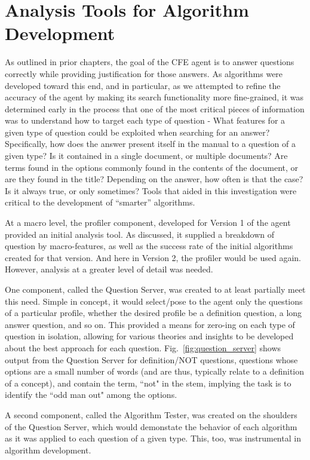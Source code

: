 \section{Analysis Tools for Algorithm Development}

As outlined in prior chapters, the goal of the CFE agent is to answer questions correctly while providing justification for those answers.  As algorithms were developed toward this end, and in particular, as we attempted to refine the accuracy of the agent by making its search functionality more fine-grained, it was determined early in the process that one of the most critical pieces of information was to understand how to target each type of question - What features for a given type of question could be exploited when searching for an answer?  Specifically, how does the answer present itself in the manual to a question of a given type?  Is it contained in a single document, or multiple documents?  Are terms found in the options commonly found in the contents of the document, or are they found in the title?  Depending on the answer, how often is that the case?  Is it always true, or only sometimes?  Tools that aided in this investigation were critical to the development of ``smarter'' algorithms.  

At a macro level, the profiler component, developed for Version 1 of the agent provided an initial analysis tool.  As discussed, it supplied a breakdown of question by macro-features, as well as the success rate of the initial algorithms created for that version.  And here in Version 2, the profiler would be used again.  However, analysis at a greater level of detail was needed.

One component, called the Question Server, was created to at least partially meet this need.  Simple in concept, it would select/pose to the agent only the questions of a particular profile, whether the desired profile be a definition question, a long answer question, and so on.  This provided a means for zero-ing on each type of question in isolation, allowing for various theories and insights to be developed about the best approach for each question.  Fig.~\ref{fig:question_server} shows output from the Question Server for definition/NOT questions, questions whose options are a small number of words (and are thus, typically relate to a definition of a concept), and contain the term, ``not" in the stem, implying the task is to identify the ``odd man out" among the options.

A second component, called the Algorithm Tester, was created on the shoulders of the Question Server, which would demonstate the behavior of each algorithm as it was applied to each question of a given type.  This, too, was instrumental in algorithm development.

